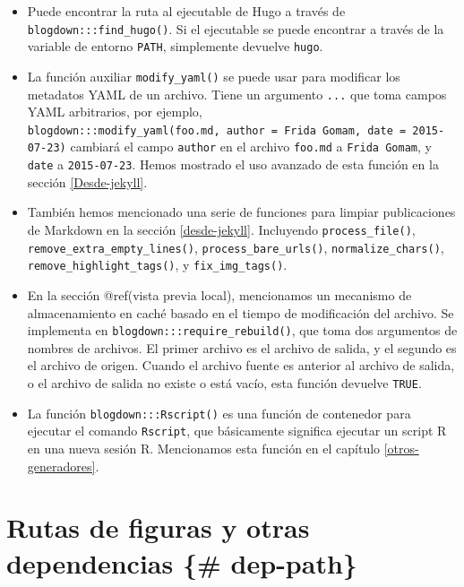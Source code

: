 \documentclass[12pt,]{krantz}
\theoremstyle{definition}
\theoremstyle{definition}
\theoremstyle{definition}
\theoremstyle{remark}
\begin{document}
\begin{itemize}
\item
  Puede encontrar la ruta al ejecutable de Hugo a través de
  \texttt{blogdown:::find\_hugo()}. Si el ejecutable se puede encontrar
  a través de la variable de entorno \texttt{PATH}, simplemente devuelve
  \texttt{\textquotesingle{}hugo\textquotesingle{}}.
\item
  La función auxiliar \texttt{modify\_yaml()} se puede usar para
  modificar los metadatos YAML de un archivo. Tiene un argumento
  \texttt{...} que toma campos YAML arbitrarios, por ejemplo,
  \texttt{blogdown:::modify\_yaml(\textquotesingle{}foo.md\textquotesingle{},\ author\ =\ \textquotesingle{}Frida\ Gomam\textquotesingle{},\ date\ =\ \textquotesingle{}2015-07-23\textquotesingle{})}
  cambiará el campo \texttt{author} en el archivo \texttt{foo.md} a
  \texttt{Frida\ Gomam}, y \texttt{date} a \texttt{2015-07-23}. Hemos
  mostrado el uso avanzado de esta función en la sección
  \ref{Desde-jekyll}.
\item
  También hemos mencionado una serie de funciones para limpiar
  publicaciones de Markdown en la sección \ref{desde-jekyll}. Incluyendo
  \texttt{process\_file()}, \texttt{remove\_extra\_empty\_lines()},
  \texttt{process\_bare\_urls()}, \texttt{normalize\_chars()},
  \texttt{remove\_highlight\_tags()}, y \texttt{fix\_img\_tags()}.
\item
  En la sección @ref(vista previa local), mencionamos un mecanismo de
  almacenamiento en caché basado en el tiempo de modificación del
  archivo. Se implementa en \texttt{blogdown:::require\_rebuild()}, que
  toma dos argumentos de nombres de archivos. El primer archivo es el
  archivo de salida, y el segundo es el archivo de origen. Cuando el
  archivo fuente es anterior al archivo de salida, o el archivo de
  salida no existe o está vacío, esta función devuelve \texttt{TRUE}.
\item
  La función \texttt{blogdown:::Rscript()} es una función de contenedor
  para ejecutar el comando \texttt{Rscript}, que básicamente significa
  ejecutar un script R en una nueva sesión R. Mencionamos esta función
  en el capítulo \ref{otros-generadores}.
\end{itemize}

\hypertarget{rutas-de-figuras-y-otras-dependencias-dep-path}{%
\section{Rutas de figuras y otras dependencias \{\#
dep-path\}}\label{rutas-de-figuras-y-otras-dependencias-dep-path}}
\end{document}
